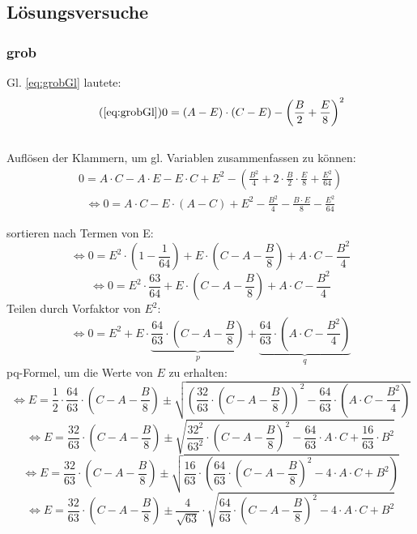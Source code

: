 \documentclass[12pt,a4paper]{article}
\begin{document}
\subsection{Lösungsversuche}

\subsubsection{grob}\label{sec:grobeLsg} 
Gl. \eqref{eq:grobGl} lautete:
\begin{gather}
\tag{\ref{eq:grobGl}}
 0 = \left( A-E\right) \cdot \left( C-E\right) 
  - \left( \frac{B}{2} + \frac{E}{8}\right) ^2 
 \end{gather}\\
  
Auflösen der Klammern, um gl. Variablen zusammenfassen zu können: 
\begin{gather}
0 = A\cdot C - A\cdot E - E\cdot C + E^2 - \left(  \frac{B^2}{4} + 2\cdot \frac{B}{2} \cdot \frac{E}{8} + \frac{E^2}{64}  \right)
\end{gather}
\begin{gather}
\Leftrightarrow 0 =A\cdot C - E\cdot \left(A-C\right) + E^2 - \frac{B^2}{4} - \frac{B \cdot E}{8} - \frac{E^2}{64}
\end{gather}

sortieren nach Termen von E: 
$$\Leftrightarrow 0 = E^2\cdot \left( 1-\frac{1}{64}\right) + E \cdot \left( C-A - \frac{B}{8}\right) + A \cdot C - \frac{B^2}{4} $$
 $$\Leftrightarrow 0 = E^2\cdot \frac{63}{64} + E \cdot \left( C-A - \frac{B}{8}\right) + A \cdot C - \frac{B^2}{4} $$
 Teilen durch Vorfaktor von $E^2$: 
$$\Leftrightarrow 0 = E ^2 + E \cdot \underbrace{ \frac{64}{63}\cdot \left( C-A - \frac{B}{8}\right)}_p + \underbrace{\frac{64}{63} \cdot \left( A\cdot C - \frac{B^2}{4} \right) }_q$$
 pq-Formel, um die Werte von $E$ zu erhalten: 
 $$\Leftrightarrow E = \frac{1}{2}\cdot \frac{64}{63}\cdot \left( C-A - \frac{B}{8}\right) \pm \sqrt{ \left( \frac{32}{63}\cdot \left( C-A - \frac{B}{8}\right) \right) ^2 
 - \frac{64}{63} \cdot \left( A\cdot C - \frac{B^2}{4} \right)
 }
  $$
  $$\Leftrightarrow E =  \frac{32}{63}\cdot \left( C-A - \frac{B}{8}\right) \pm 
  \sqrt{ \frac{32^2}{63^2}\cdot 
\left( C-A - \frac{B}{8}\right) ^2 
 - \frac{64}{63} \cdot  A\cdot C + \frac{16}{63} \cdot B^2 
 }
  $$
    $$\Leftrightarrow E =  \frac{32}{63}\cdot \left( C-A - \frac{B}{8}\right) \pm 
  \sqrt{
  \frac{16}{63} \cdot \left( 
     \frac{64}{63}\cdot 
\left( C-A - \frac{B}{8}\right) ^2 
 - 4 \cdot  A\cdot C + B^2 
 \right)
 }
  $$
  $$\Leftrightarrow E =  \frac{32}{63}\cdot \left( C-A - \frac{B}{8}\right) \pm 
    \frac{4}{\sqrt{63} }
  \cdot 
  \sqrt{
     \frac{64}{63}\cdot 
\left( C-A - \frac{B}{8}\right) ^2 
 - 4 \cdot  A\cdot C + B^2 
 }
  $$ \\
  
\end{document}
